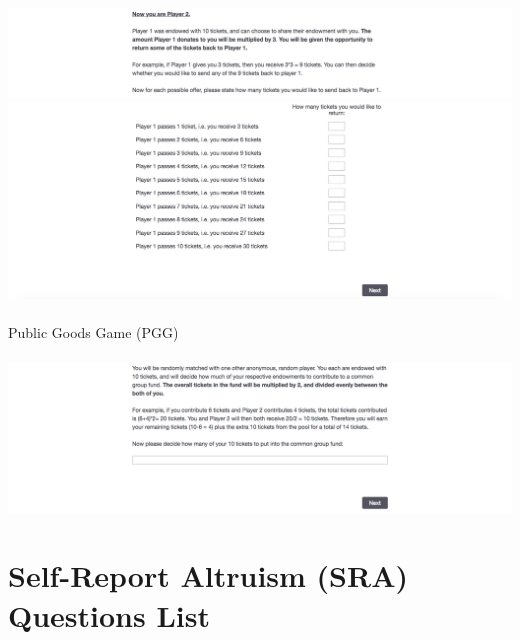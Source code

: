 \documentclass[12pt]{article}
\begin{document}
\includegraphics[scale=0.35]{trust2} \\
\includegraphics[scale=0.35]{trust3} \\ \\
\noindent Public Goods Game (PGG) \\ \\
\includegraphics[scale=0.35]{public} \\


\section{Self-Report Altruism (SRA) Questions List} \label{app:b}
\end{document}
